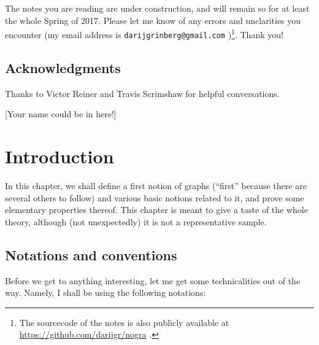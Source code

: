 \documentclass[numbers=enddot,12pt,final,onecolumn,notitlepage]{scrartcl}%
\theoremstyle{definition}
\begin{document}
The notes you are reading are under construction, and will remain so for at
least the whole Spring of 2017. Please let me know of any errors and
unclarities you encounter (my email address is \texttt{darijgrinberg@gmail.com}%
)\footnote{The sourcecode of the notes is also publicly available at
\url{https://github.com/darijgr/nogra} .}. Thank you!

\subsection{Acknowledgments}

Thanks to Victor Reiner and Travis Scrimshaw for helpful
conversations.

[Your name could be in here!]

\section{\label{chp.intro}Introduction}

In this chapter, we shall define a first notion of graphs (``first''
because there are several others to follow) and various basic notions
related to it, and prove some elementary properties thereof. This
chapter is meant to give a taste of the whole theory, although (not
unexpectedly) it is not a representative sample.

\subsection{\label{sect.intro.notations}Notations and conventions}

Before we get to anything interesting, let me get some technicalities
out of the way. Namely, I shall be using the following notations:
\end{document}
